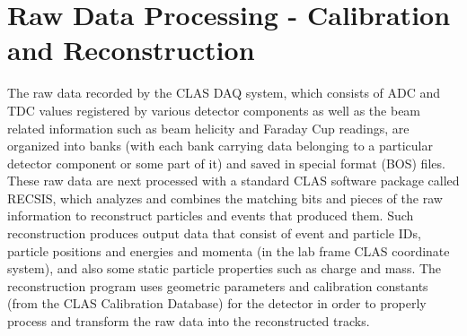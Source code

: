 
\hspace{0.5cm}

\section{Raw Data Processing - Calibration and Reconstruction}   %

The raw data recorded by the CLAS DAQ system, which consists of ADC and TDC values registered by various detector components as well as the beam related information such as beam helicity and Faraday Cup readings, are organized into banks (with each bank carrying data belonging to a particular detector component or some part of it) and saved in special format (BOS) files. These raw data are next processed with a standard CLAS software package called RECSIS, which analyzes and combines the matching bits and pieces of the raw information to reconstruct particles and events that produced them. Such reconstruction produces output data that consist of event and particle IDs, particle positions and energies and momenta (in the lab frame CLAS coordinate system), and also some static particle properties such as charge and mass. The reconstruction program uses geometric parameters and calibration constants (from the %
CLAS Calibration Database) for the detector %
in order to properly process and transform the raw data into the reconstructed tracks.


